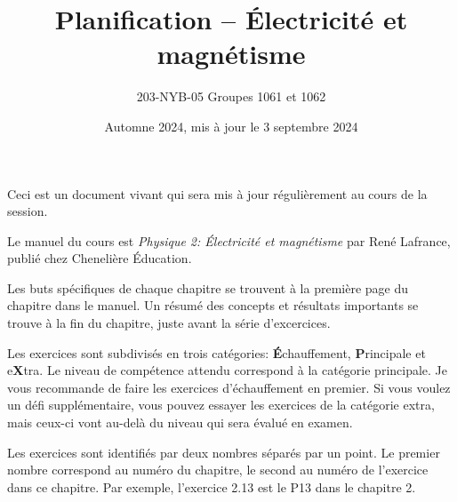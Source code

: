\documentclass[10pt]{article}
\title{Planification -- Électricité et magnétisme}
\author{203-NYB-05  Groupes 1061 et 1062}
\date{Automne 2024, mis à jour le 3 septembre 2024}
\begin{document}
\makeatletter
\begin{center}
  {\LARGE \noindent\@title}
  \vspace{0.6em}

  {\large \noindent\@author}
  \vspace{0.2em}

  {\large \noindent\@date}
\end{center}
\vspace{2em}
\makeatother

\noindent Ceci est un document vivant qui sera mis à jour régulièrement au cours de la
session.

\vspace{1em}

\noindent Le manuel du cours est \emph{Physique 2: Électricité et magnétisme} par René
Lafrance, publié chez Chenelière Éducation.

\vspace{1em}

\noindent Les buts spécifiques de chaque chapitre se trouvent à la première
page du chapitre dans le manuel. Un résumé des concepts et résultats importants
se trouve à la fin du chapitre, juste avant la série d'excercices.

\vspace{1em}

\noindent Les exercices sont subdivisés en trois catégories:
\textbf{É}chauffement, \textbf{P}rincipale et e\textbf{X}tra. Le niveau de
compétence attendu correspond à la catégorie principale. Je vous recommande de
faire les exercices d'échauffement en premier. Si vous voulez un défi
supplémentaire, vous pouvez essayer les exercices de la catégorie extra, mais
ceux-ci vont au-delà du niveau qui sera évalué en examen.

\vspace{1em}

\noindent Les exercices sont identifiés par deux nombres séparés par un point.
Le premier nombre correspond au numéro du chapitre, le second au numéro de
l'exercice dans ce chapitre. Par exemple, l'exercice 2.13 est le P13 dans le
chapitre 2.
\end{document}
